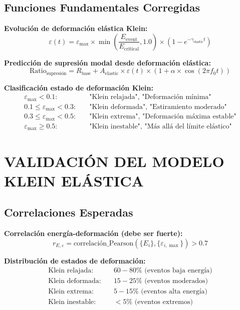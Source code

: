 \documentclass[12pt,a4paper]{article}
\begin{document}
\subsection{Funciones Fundamentales Corregidas}

\textbf{Evolución de deformación elástica Klein:}
\begin{equation}
\varepsilon(t) = \varepsilon_{\max} \times \min\left(\frac{E_{\text{event}}}{E_{\text{critical}}}, 1.0\right) \times (1 - e^{-\gamma_{\text{elastic}} t})
\end{equation}

\textbf{Predicción de supresión modal desde deformación elástica:}
\begin{equation}
\text{Ratio}_{\text{supresión}} = R_{\text{base}} + A_{\text{elastic}} \times \varepsilon(t) \times (1 + \alpha \times \cos(2\pi f_0 t))
\end{equation}

\textbf{Clasificación estado de deformación Klein:}
\begin{align}
\varepsilon_{\max} < 0.1: &\quad \text{"Klein relajada", "Deformación mínima"}\\
0.1 \leq \varepsilon_{\max} < 0.3: &\quad \text{"Klein deformada", "Estiramiento moderado"}\\
0.3 \leq \varepsilon_{\max} < 0.5: &\quad \text{"Klein extrema", "Deformación máxima estable"}\\
\varepsilon_{\max} \geq 0.5: &\quad \text{"Klein inestable", "Más allá del límite elástico"}
\end{align}

\section{VALIDACIÓN DEL MODELO KLEIN ELÁSTICA}

\subsection{Correlaciones Esperadas}

\textbf{Correlación energía-deformación (debe ser fuerte):}
\begin{equation}
r_{E,\varepsilon} = \text{correlación_Pearson}(\{E_i\}, \{\varepsilon_{i,\max}\}) > 0.7
\end{equation}

\textbf{Distribución de estados de deformación:}
\begin{align}
\text{Klein relajada:} &\quad 60-80\% \text{ (eventos baja energía)}\\
\text{Klein deformada:} &\quad 15-25\% \text{ (eventos moderados)}\\
\text{Klein extrema:} &\quad 5-15\% \text{ (eventos alta energía)}\\
\text{Klein inestable:} &\quad <5\% \text{ (eventos extremos)}
\end{align}
\end{document}

